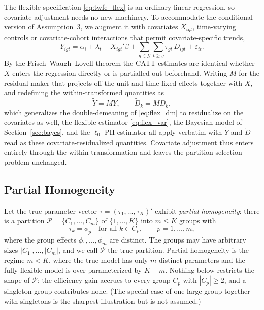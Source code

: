 \documentclass[margin=5in, 12pt]{article}
\newcommand{\1}{\mathbbm{1}}
\begin{document}
The flexible specification \eqref{eq:twfe_flex} is an ordinary linear regression, so covariate adjustment needs no new machinery. To accommodate the conditional version of Assumption~3, we augment it with covariates $X_{igt}$, time-varying controls or covariate-cohort interactions that permit covariate-specific trends,
\begin{equation}
  Y_{igt} = \alpha_i + \lambda_t + X_{igt}'\beta + \sum_{g \in \mathcal{G}} \sum_{t \geq g} \tau_{gt}\, D_{igt} + \varepsilon_{it}.
  \label{eq:twfe_cov}
\end{equation}
By the Frisch--Waugh--Lovell theorem the CATT estimates are identical whether $X$ enters the regression directly or is partialled out beforehand. Writing $M$ for the residual-maker that projects off the unit and time fixed effects together with $X$, and redefining the within-transformed quantities as
\begin{equation}
  \tilde{Y} = M Y, \qquad \tilde{D}_k = M D_k,
  \label{eq:resid_cov}
\end{equation}
which generalizes the double-demeaning of \eqref{eq:flex_dm} to residualize on the covariates as well, the flexible estimator \eqref{eq:flex_var}, the Bayesian model of Section~\ref{sec:bayes}, and the $\ell_0$-PH estimator all apply verbatim with $\tilde{Y}$ and $\tilde{D}$ read as these covariate-residualized quantities. Covariate adjustment thus enters entirely through the within transformation and leaves the partition-selection problem unchanged.

\bigskip

\subsection{Partial Homogeneity}
Let the true parameter vector $\tau = (\tau_1,\ldots,\tau_K)'$ exhibit
\emph{partial homogeneity}: there is a partition
$\mathcal{P} = \{C_1,\ldots,C_m\}$ of $\{1,\ldots,K\}$ into $m \leq K$ groups with
\begin{equation}
  \tau_k = \phi_p \quad \text{for all } k \in C_p, \qquad p = 1,\ldots,m,
  \label{eq:ph_partition}
\end{equation}
where the group effects $\phi_1,\ldots,\phi_m$ are distinct. The groups may have
arbitrary sizes $|C_1|,\ldots,|C_m|$, and we call $\mathcal{P}$ the true
partition. Partial homogeneity is the regime $m < K$, where the true model has
only $m$ distinct parameters and the fully flexible model is over-parameterized
by $K - m$. Nothing below restricts the shape of $\mathcal{P}$; the efficiency
gain accrues to every group $C_p$ with $|C_p| \geq 2$, and a singleton group
contributes none. (The special case of one large group together with singletons
is the sharpest illustration but is not assumed.)
\end{document}

